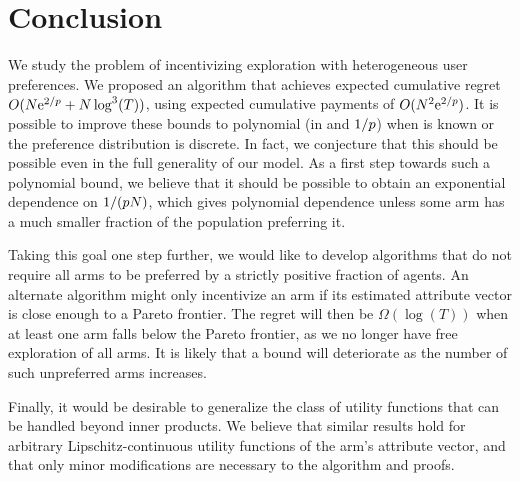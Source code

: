 \section{Conclusion}
We study the problem of incentivizing exploration with heterogeneous
user preferences.
We proposed an algorithm that achieves expected cumulative regret
$O(N \mathrm{e}^{2/p} + N \log^3(T))$,
using expected cumulative payments of $O(N^2 \mathrm{e}^{2/p})$.
It is possible to improve these bounds to polynomial (in \ARMNUM and
$1/p$) when \MinProb is known or the preference distribution is
discrete.
In fact, we conjecture that this should be possible even in the full
generality of our model.
As a first step towards such a polynomial bound, we believe that it
should be possible to obtain an exponential dependence on
$1/(p N)$, which gives polynomial dependence unless some
arm has a much smaller fraction of the population preferring it.

Taking this goal one step further, we would like to 
develop algorithms that do not require all arms to be preferred by a
strictly positive fraction of agents.
An alternate algorithm might only incentivize an arm if its estimated
attribute vector is close enough to a Pareto frontier.
The regret will then be $\Omega(\log(T))$ when at least one arm falls
below the Pareto frontier, as we no longer have free exploration of
all arms. 
It is likely that a bound will deteriorate as the number of such
unpreferred arms increases.

Finally, it would be desirable to generalize the class of utility
functions that can be handled beyond inner products.
We believe that similar results hold for arbitrary
Lipschitz-continuous utility functions of the arm's attribute vector,
and that only minor modifications are necessary to the algorithm and
proofs.
